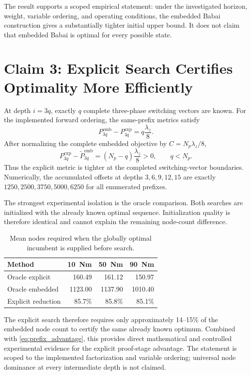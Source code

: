 \documentclass[paper=a4,oneside,fontsize=12pt,DIV=14,headings=normal,parskip=half,headsepline,numbers=noendperiod]{scrreprt}
\begin{document}
The result supports a scoped empirical statement: under the investigated
horizon, weight, variable ordering, and operating conditions, the embedded
Babai construction gives a substantially tighter initial upper bound.  It does
not claim that embedded Babai is optimal for every possible state.

\chapter{Claim 3: Explicit Search Certifies Optimality More Efficiently}

At depth $i=3q$, exactly $q$ complete three-phase switching vectors are known.
For the implemented forward ordering, the same-prefix metrics satisfy
\begin{equation}
 P_{3q}^{\mathrm{emb}}-P_{3q}^{\mathrm{exp}}
 =q\frac{\lambda_z}{8}.
\end{equation}
After normalizing the complete embedded objective by
$C=N_p\lambda_z/8$,
\begin{equation}
 P_{3q}^{\mathrm{exp}}-\widetilde P_{3q}^{\mathrm{emb}}
 =(N_p-q)\frac{\lambda_z}{8}>0,
 \qquad q<N_p.
 \label{eq:prefix_advantage}
\end{equation}
Thus the explicit metric is tighter at the completed switching-vector
boundaries.  Numerically, the accumulated offsets at depths
$3,6,9,12,15$ are exactly $1250,2500,3750,5000,6250$ for all enumerated
prefixes.

The strongest experimental isolation is the oracle comparison.  Both searches
are initialized with the already known optimal sequence.  Initialization
quality is therefore identical and cannot explain the remaining node-count
difference.

\begin{table}[H]
\centering
\caption{Mean nodes required when the globally optimal incumbent is supplied
before search.}
\label{tab:oracle}
\begin{tabular}{lrrr}
\toprule
Method & 10~Nm & 50~Nm & 90~Nm\\
\midrule
Oracle explicit & 160.49 & 161.12 & 150.97\\
Oracle embedded & 1123.00 & 1137.90 & 1010.40\\
Explicit reduction & 85.7\% & 85.8\% & 85.1\%\\
\bottomrule
\end{tabular}
\end{table}

The explicit search therefore requires only approximately 14--15\% of the
embedded node count to certify the same already known optimum.  Combined with
\cref{eq:prefix_advantage}, this provides direct mathematical and controlled
experimental evidence for the explicit proof-stage advantage.  The statement
is scoped to the implemented factorization and variable ordering; universal
node dominance at every intermediate depth is not claimed.
\end{document}
